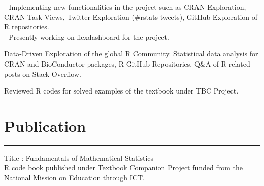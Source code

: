\documentclass[]{meetresume-class}
\begin{document}
\begin{minipage}[t]{0.66\textwidth}
		 
		\descript{}
		\noindent
		\hspace{6em}%
		\begin{minipage}{0.80\textwidth\vspace{2pt}}
			 - Implementing new functionalities in the project such as CRAN Exploration, CRAN Task Views, Twitter Exploration (\#rstats tweets), GitHub Exploration of R repositories.\\
			 - Presently working on flexdashboard for the project.
		\end{minipage}
		\sectionsep
		
		 
		\descript{}
		\noindent
		\hspace{5em}%
		\begin{minipage}{0.85\textwidth\vspace{2pt}}
			Data-Driven Exploration of the global R Community. Statistical data analysis for
			CRAN and BioConductor packages, R GitHub Repositories, Q\&A of R related
			posts on Stack Overflow.
		\end{minipage}
		\sectionsep
		
		 
		\noindent
		\hspace{5em}%
		\begin{minipage}{0.85\textwidth\vspace{2pt}}
			Reviewed R codes for solved examples of the textbook under TBC Project. 
		\end{minipage}
		\sectionsep
		\section{Publication} 
		\noindent\rule{12.5cm}{0.4pt}
		 
		\noindent
		\hspace{5em}%
		\begin{minipage}{0.85\textwidth\vspace{2pt}}
			Title : Fundamentals of Mathematical Statistics\\
			R code book published under Textbook Companion Project funded
			from the National Mission on Education through ICT.


\end{minipage}
\end{minipage}
\end{document}
